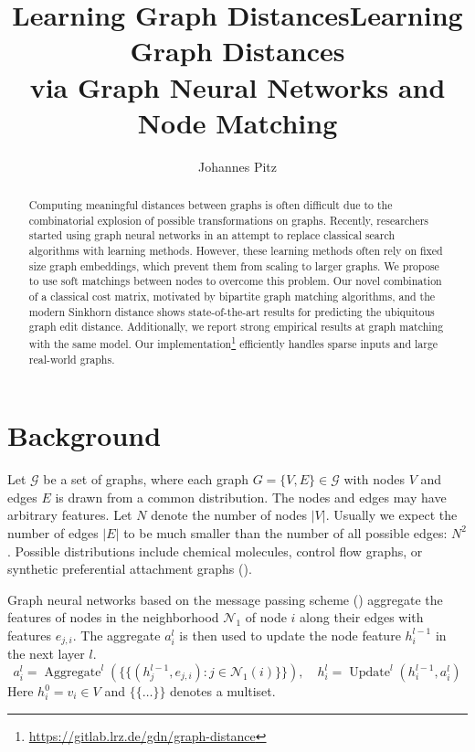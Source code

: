\documentclass[a4paper,10pt]{article}
\title{Learning Graph Distances} %
\author{Johannes Pitz} %
\institute{\textit{Guided Research: Data Analytics and Machine Learning Group  \protect\\ TUM Department of Informatics}}
\begin{document}
\title{Learning Graph Distances \protect\\ via Graph Neural Networks and Node Matching}
\maketitle

\begin{abstract}


Computing meaningful distances between graphs is often difficult due to the combinatorial explosion of possible transformations on graphs. Recently, researchers started using graph neural networks in an attempt to replace classical search algorithms with learning methods. However, these learning methods often rely on fixed size graph embeddings, which prevent them from scaling to larger graphs. We propose to use soft matchings between nodes to overcome this problem. Our novel combination of a classical cost matrix, motivated by bipartite graph matching algorithms, and the modern Sinkhorn distance shows state-of-the-art results for predicting the ubiquitous graph edit distance. Additionally, we report strong empirical results at graph matching with the same model. Our implementation\footnote{\url{https://gitlab.lrz.de/gdn/graph-distance}} efficiently handles sparse inputs and large real-world graphs.


\end{abstract}



\section{Background}

Let $\mathcal{G}$ be a set of graphs, where each graph $G = \{V, E\} \in \mathcal{G}$ with nodes $V$ and edges $E$ is drawn from a common distribution. The nodes and edges may have arbitrary features. Let $N$ denote the number of nodes $\vert V \vert$. Usually we expect the number of edges $\vert E \vert$ to be much smaller than the number of all possible edges: $N^2$. Possible distributions include chemical molecules, control flow graphs, or synthetic preferential attachment graphs (\citealp{pref_att2002}).

Graph neural networks based on the message passing scheme (\citealp{gilmer2017}) aggregate the features of nodes in the neighborhood $\mathcal{N}_1$ of node $i$ along their edges with features $e_{j,i}$. The aggregate $a_i^l$ is then used to update the node feature $h_i^{l-1}$ in the next layer $l$.
\begin{equation}
    a_i^l = \operatorname{Aggregate}^l\left(\{\!\!\{(h_j^{l-1}, e_{j,i}) : j \in \mathcal{N}_1(i)\}\!\!\}\right), \quad
    h_i^l = \operatorname{Update}^l\left( h_i^{l-1}, a_i^l \right)
\end{equation}
Here $h_i^0 = v_i \in V$ and $\{\!\!\{ \dots \}\!\!\}$ denotes a multiset.
\end{document}
